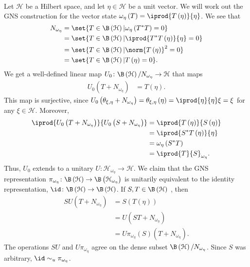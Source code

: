 \documentclass[10pt]{mypackage}
\begin{document}
\begin{example}
  Let $\mathcal{H}$ be a Hilbert space, and let $\eta\in \mathcal{H}$ be a unit vector. We will work out the GNS construction for the vector state $\omega_{\eta}\left(T\right) = \iprod{T\left(\eta\right)}{\eta}$. We see that
  \begin{align*}
    N_{\omega_{\eta}} &= \set{T\in\B\left(\mathcal{H}\right) | \omega_{\eta}\left(T^{\ast}T\right) = 0}\\
                      &= \set{T\in\B\left(\mathcal{H}\right) | \iprod{T^{\ast}T\left(\eta\right)}{\eta} = 0}\\
                      &= \set{T\in \B\left(\mathcal{H}\right) | \norm{T\left(\eta\right)}^2 = 0}\\
                      &= \set{T\in \B\left(\mathcal{H}\right) | T\left(\eta\right) = 0}.
  \end{align*}
  We get a well-defined linear map $U_0\colon \B\left(\mathcal{H}\right)/N_{\omega_{\eta}} \rightarrow \mathcal{H}$ that maps
  \begin{align*}
    U_0\left(T + N_{\omega_{\eta}}\right) &= T\left(\eta\right).
  \end{align*}
  This map is surjective, since $U_0\left(\theta_{\xi,\eta} + N_{\omega_{\eta}}\right) = \theta_{\xi,\eta}\left(\eta\right) = \iprod{\eta}{\eta}\xi = \xi$ for any $\xi\in \mathcal{H}$. Moreover, 
  \begin{align*}
    \iprod{U_0\left(T + N_{\omega_{\eta}}\right)}{ U_0\left(S + N_{\omega_{\eta}}\right) } &= \iprod{T\left(\eta\right)}{S\left(\eta\right)}\\
                                                                                           &= \iprod{S^{\ast}T\left(\eta\right)}{\eta}\\
                                                                                           &= \omega_{\eta}\left(S^{\ast}T\right)\\
                                                                                           &= \iprod{T}{S}_{\omega_{\eta}}.
  \end{align*}
  Thus, $U_0$ extends to a unitary $U\colon \mathcal{H}_{\omega_{\eta}}\rightarrow \mathcal{H}$. We claim that the GNS representation $\pi_{\omega_{\eta}}\colon \B\left(\mathcal{H}\right)\rightarrow \B\left(\mathcal{H}_{\omega_{\eta}}\right)$ is unitarily equivalent to the identity representation, $\id\colon \B\left(\mathcal{H}\right)\rightarrow \B\left(\mathcal{H}\right)$. If $S,T\in \B\left(\mathcal{H}\right)$ , then
  \begin{align*}
    SU\left(T + N_{\omega_{\eta}}\right) &= S\left(T\left(\eta\right)\right)\\
                                         &= U\left(ST + N_{\omega_{\eta}}\right)\\
                                         &= U\pi_{\omega_{\eta}}\left(S\right)\left(T + N_{\omega_{\eta}}\right).
  \end{align*}
  The operations $SU$ and $U\pi_{\omega_{\eta}}$ agree on the dense subset $\B\left(\mathcal{H}\right)/N_{\omega_{\eta}}$. Since $S$ was arbitrary, $\id\sim_{u}\pi_{\omega_{\eta}}$.
\end{example}
\end{document}
